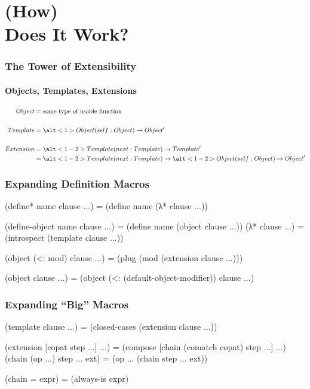 \documentclass[aspectratio=169]{beamer}
\begin{document}
\section{(How) \\ Does It Work?}

\begin{frame}
\frametitle{The Tower of Extensibility}
\framesubtitle{Objects, Templates, Extensions}

\begin{align*}
  Object
  &=
  \text{some type of usable function}
  \\\\
  Template
  &=
  \alt<1>{Object}{(self : Object)} \to Object'
  \\\\
  Extension
  &=
  \alt<1-2>{Template}{(next : Template)} \to Template'
  \\
  &=
  \alt<1-2>{Template}{(next : Template)}
  \to \alt<1-2>{Object}{(self : Object)}
  \to Object'
\end{align*}

\pause\pause
\end{frame}

\let\mintscheme\scheme
\let\mintendscheme\endscheme
\let\scheme\relax
\let\endscheme\relax
{}

\begin{frame}[fragile]
\frametitle{Expanding Definition Macros}

\begin{scheme}
(define* name clause ...) = (define name (λ* clause ...))

(define-object name clause ...) = (define name (object clause ...))
\end{scheme}
\pause
\begin{scheme}
(λ* clause ...) = (introspect (template clause ...))

(object (<: mod) clause ...) = (plug (mod (extension clause ...)))

(object clause ...) = (object (<: (default-object-modifier)) clause ...)
\end{scheme}
\end{frame}

\begin{frame}[fragile]
\frametitle{Expanding ``Big'' Macros}

\begin{scheme}
(template clause ...)
= (closed-cases (extension clause ...))

(extension [copat step ...] ...)
= (compose [chain (comatch copat) step ...] ...)
\end{scheme}
\pause
\begin{scheme}
(chain (op ...) step ... ext) = (op ... (chain step ... ext))

(chain = expr) = (always-is expr)
\end{scheme}
\end{frame}
\end{document}
